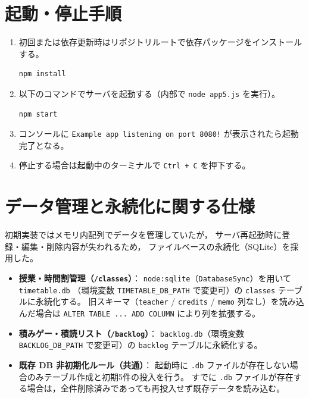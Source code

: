 \documentclass[
  a4paper,
  fontsize=11pt,
  line_length=40zw,
  number_of_lines=35,
  baselineskip=1.7zw
]{jlreq}
\begin{document}
\section{起動・停止手順}

\begin{enumerate}
  \item 初回または依存更新時はリポジトリルートで依存パッケージをインストールする。
\begin{lstlisting}[language=bash]
npm install
\end{lstlisting}
  \item 以下のコマンドでサーバを起動する（内部で \texttt{node app5.js} を実行）。
\begin{lstlisting}[language=bash]
npm start
\end{lstlisting}
  \item コンソールに \texttt{Example app listening on port 8080!} が表示されたら起動完了となる。
  \item 停止する場合は起動中のターミナルで \texttt{Ctrl + C} を押下する。
\end{enumerate}

\section{データ管理と永続化に関する仕様}

初期実装ではメモリ内配列でデータを管理していたが，
サーバ再起動時に登録・編集・削除内容が失われるため，
ファイルベースの永続化（SQLite）を採用した。

\begin{itemize}
  \item \textbf{授業・時間割管理（\texttt{/classes}）}：
    \texttt{node:sqlite}（\texttt{DatabaseSync}）を用いて \texttt{timetable.db}
    （環境変数 \texttt{TIMETABLE\_DB\_PATH} で変更可）の \texttt{classes} テーブルに永続化する。
    旧スキーマ（\texttt{teacher} / \texttt{credits} / \texttt{memo} 列なし）を読み込んだ場合は
    \texttt{ALTER TABLE ... ADD COLUMN} により列を拡張する。
  \item \textbf{積みゲー・積読リスト（\texttt{/backlog}）}：
    \texttt{backlog.db}（環境変数 \texttt{BACKLOG\_DB\_PATH} で変更可）の
    \texttt{backlog} テーブルに永続化する。
  \item \textbf{既存 DB 非初期化ルール（共通）}：
    起動時に \texttt{.db} ファイルが存在しない場合のみテーブル作成と初期5件の投入を行う。
    すでに \texttt{.db} ファイルが存在する場合は，全件削除済みであっても再投入せず既存データを読み込む。
\end{itemize}
\end{document}
